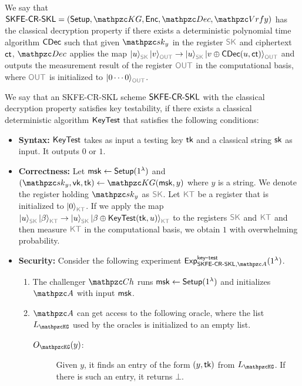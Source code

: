 \begin{definition}\label{def:classical-Dec-SKFE}
We say that $\SKFESKL=(\Setup,\qKG,\Enc,\qDec,\qVrfy)$ has
the classical decryption property if there exists a deterministic
polynomial time algorithm $\mathsf{CDec}$ such that given $\qsk_y$ in the
register $\qreg{SK}$ and ciphertext $\mathsf{ct}$, $\qDec$ applies the map
$\ket{u}_{\qreg{SK}}\ket{v}_{\qreg{OUT}}\ra\ket{u}_{\qreg{SK}}\ket{v\oplus\CDec(u,\ct)}_{\qreg{OUT}}$
and outputs the measurement result of the register $\qreg{OUT}$ in
the computational basis, where $\qreg{OUT}$ is initialized to
$\ket{0\cdots0}_{\qreg{OUT}}$.
\end{definition}
\begin{definition}\label{def:key-testability-SKFE}
We say that an SKFE-CR-SKL scheme $\mathsf{SKFE}\textrm{-}\mathsf{CR}\textrm{-}\mathsf{SKL}$ with the classical
decryption property satisfies key testability, if there exists a
classical deterministic algorithm $\mathsf{KeyTest}$ that satisfies the
following conditions:

\begin{itemize}
\item \textbf{Syntax:} $\mathsf{KeyTest}$ takes as input a testing key $\mathsf{tk}$
and a classical string $\mathsf{sk}$ as input. It outputs $0$ or $1$.

\item \textbf{Correctness:} Let $\mathsf{msk}\leftarrow\mathsf{Setup}(1^\lambda)$ and
$(\qsk_y,\vk,\tk)\gets\qKG(\msk,y)$ where $y$ is a string. We denote the register holding
$\qsk_y$ as $\qreg{SK}$. Let $\qreg{KT}$ be a register that is
initialized to $\ket{0}_{\qreg{KT}}$. If we apply the map
$\ket{u}_{\qreg{SK}}\ket{\beta}_{\qreg{KT}}\ra\ket{u}_{\qreg{SK}}\ket{\beta\oplus\KeyTest(\tk,u)}_{\qreg{KT}}$
to the registers $\qreg{SK}$ and $\qreg{KT}$ and then measure
$\qreg{KT}$ in the computational basis, we obtain $1$ with
overwhelming probability.

\item \textbf{Security:} Consider the following experiment
$\expb{\SKFESKL,\qA}{key}{test}(1^\secp)$.

\begin{enumerate}
\item The challenger $\qCh$ runs $\mathsf{msk}\leftarrow\mathsf{Setup}(1^\lambda)$ and
initializes $\qA$ with input $\mathsf{msk}$. 

\item $\qA$ can get access to the following oracle, where the list $\List{\qKG}$ used by the oracles is initialized
to an empty list.
\begin{description}
\item[$\Oracle{\qKG}(y)$:] Given $y$, it finds an entry of the form
$(y,\mathsf{tk})$ from $\List{\qKG}$. If there is such an entry, it
returns $\bot$.


\end{description}
\end{enumerate}
\end{itemize}
\end{definition}
